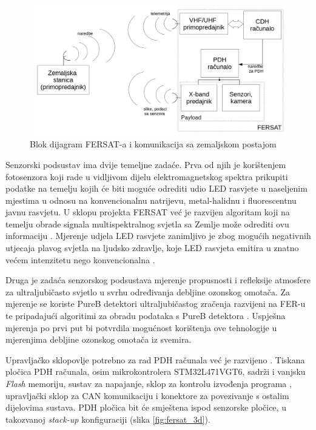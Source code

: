 \begin{figure}[htb]
    \centering
    \includegraphics[width=\textwidth]{slike/fersat_blok_dijagram.png}
    \caption{Blok dijagram FERSAT-a i komunikacija sa zemaljskom postajom \cite{diplomski_goran_petrak}}
    \label{fig:fersat_blok}
\end{figure}

Senzorski podsustav ima dvije temeljne zadaće. Prva od njih je korištenjem fotosenzora koji rade u vidljivom dijelu elektromagnetskog spektra prikupiti podatke na temelju kojih će biti moguće odrediti udio LED rasvjete u naseljenim mjestima u odnosu na konvencionalnu natrijevu, metal-halidnu i fluorescentnu javnu rasvjetu. U sklopu projekta FERSAT već je razvijen algoritam koji na temelju obrade signala multispektralnog svjetla sa Zemlje može odrediti ovu informaciju \cite{diplomski_jakov_tutavac}. Mjerenje udjela LED rasvjete zanimljivo je zbog mogućih negativnih utjecaja plavog svjetla na ljudsko zdravlje, koje LED rasvjeta emitira u znatno većem intenzitetu nego konvencionalna \cite{falchi_light_pollution}.

Druga je zadaća senzorskog podsustava mjerenje propusnosti i refleksije atmosfere za ultraljubičasto svjetlo u svrhu određivanja debljine ozonskog omotača. Za mjerenje se koriste PureB detektori ultraljubičastog zračenja razvijeni na FER-u \cite{diplomski_filip_bogdanovic} te pripadajući algoritimi za obradu podataka s PureB detektora \cite{zavrsni_kristian_stepancic}. Uspješna mjerenja po prvi put bi potvrdila mogućnost korištenja ove tehnologije u mjerenjima debljine ozonskog omotača iz svemira.

Upravljačko sklopovlje potrebno za rad PDH računala već je razvijeno \cite{zavrsni_filip_juric}. Tiskana pločica PDH računala, osim mikrokontrolera STM32L471VGT6, sadrži i vanjsku \textit{Flash} memoriju, sustav za napajanje, sklop za kontrolu izvođenja programa , upravljački sklop za CAN komunikaciju i konektore za povezivanje s ostalim dijelovima sustava. PDH pločica bit će smještena ispod senzorske pločice, u takozvanoj \textit{stack-up} konfiguraciji (slika \ref{fig:fersat_3d}).

